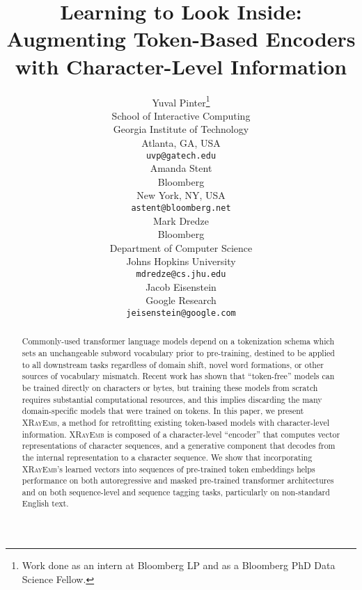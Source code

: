 \documentclass[11pt,a4paper]{article}
\title{Learning to Look Inside: Augmenting Token-Based Encoders with Character-Level Information}
\author{Yuval Pinter\thanks{Work done as an intern at Bloomberg LP and as a Bloomberg PhD Data Science Fellow.} \\
  School of Interactive Computing \\
  Georgia Institute of Technology \\
  Atlanta, GA, USA \\
  \texttt{uvp@gatech.edu} \\\And
  Amanda Stent \\
  Bloomberg \\
  New York, NY, USA \\
  \texttt{astent@bloomberg.net} \\\AND 
  Mark Dredze \\
  Bloomberg \\
  Department of Computer Science \\
  Johns Hopkins University \\
  \texttt{mdredze@cs.jhu.edu} \\\And
  Jacob Eisenstein \\
  Google Research \\
  \texttt{jeisenstein@google.com} \\}
\date{}
\newcommand{\tokdetok}[0]{\textsc{XRayEmb}}
\begin{document}
\maketitle
\begin{abstract}
    Commonly-used transformer language models depend on a tokenization schema which sets an unchangeable subword vocabulary prior to pre-training, destined to be applied to all downstream tasks regardless of domain shift, novel word formations, or other sources of vocabulary mismatch.
    Recent work has shown that ``token-free'' models can be trained directly on characters or bytes, but training these models from scratch requires substantial computational resources, and this implies discarding the many domain-specific models that were trained on tokens. In this paper, we present \tokdetok{}, a method for retrofitting existing token-based models with character-level information.  
    \tokdetok{} is composed of a character-level ``encoder'' that computes vector representations of character sequences, and a generative component that decodes from the internal representation to a character sequence.
    We show that incorporating \tokdetok{}'s learned vectors into sequences of pre-trained token embeddings helps performance on both autoregressive and masked pre-trained transformer architectures and on both sequence-level and sequence tagging tasks, particularly on non-standard English text.
\end{abstract}


















\clearpage


% 
\end{document}
